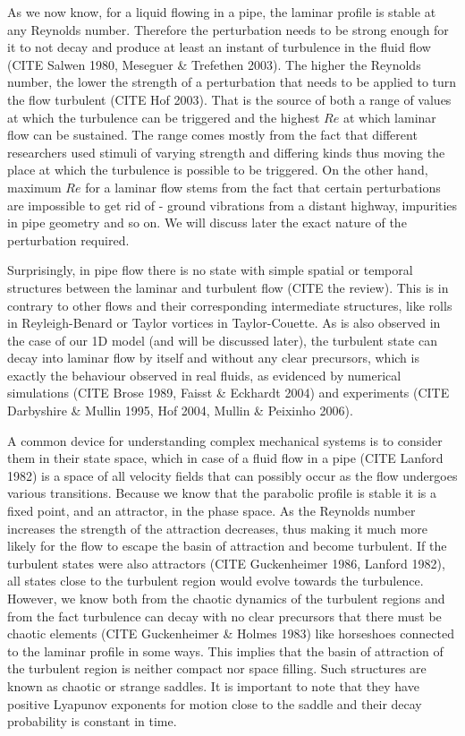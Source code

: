 \documentclass[11pt,a4paper]{article}
\begin{document}
As we now know, for a liquid flowing in a pipe, the laminar profile is stable at any Reynolds number.
Therefore the perturbation needs to be strong enough for it to not decay and produce at least an instant of turbulence in the fluid flow (CITE Salwen 1980, Meseguer \& Trefethen 2003).
The higher the Reynolds number, the lower the strength of a perturbation that needs to be applied to turn the flow turbulent (CITE Hof 2003).
That is the source of both a range of values at which the turbulence can be triggered and the highest \(Re\) at which laminar flow can be sustained.
The range comes mostly from the fact that different researchers used stimuli of varying strength and differing kinds thus moving the place at which the turbulence is possible to be triggered.
On the other hand, maximum \(Re\) for a laminar flow stems from the fact that certain perturbations are impossible to get rid of - ground vibrations from a distant highway, impurities in pipe geometry and so on.
We will discuss later the exact nature of the perturbation required.

Surprisingly, in pipe flow there is no state with simple spatial or temporal structures between the laminar and turbulent flow (CITE the review).
This is in contrary to other flows and their corresponding intermediate structures, like rolls in Reyleigh-Benard or Taylor vortices in Taylor-Couette.
As is also observed in the case of our 1D model (and will be discussed later), the turbulent state can decay into laminar flow by itself and without any clear precursors, which is exactly the behaviour observed in real fluids, as evidenced by numerical simulations (CITE Brose 1989, Faisst \& Eckhardt 2004) and experiments (CITE Darbyshire \& Mullin 1995, Hof 2004, Mullin \& Peixinho 2006).

A common device for understanding complex mechanical systems is to consider them in their state space, which in case of a fluid flow in a pipe (CITE Lanford 1982) is a space of all velocity fields that can possibly occur as the flow undergoes various transitions.
Because we know that the parabolic profile is stable it is a fixed point, and an attractor, in the phase space.
As the Reynolds number increases the strength of the attraction decreases, thus making it much more likely for the flow to escape the basin of attraction and become turbulent.
If the turbulent states were also attractors (CITE Guckenheimer 1986, Lanford 1982), all states close to the turbulent region would evolve towards the turbulence.
However, we know both from the chaotic dynamics of the turbulent regions and from the fact turbulence can decay with no clear precursors that there must be chaotic elements (CITE Guckenheimer \& Holmes 1983) like horseshoes connected to the laminar profile in some ways.
This implies that the basin of attraction of the turbulent region is neither compact nor space filling.
Such structures are known as chaotic or strange saddles.
It is important to note that they have positive Lyapunov exponents for motion close to the saddle and their decay probability is constant in time.
\end{document}
